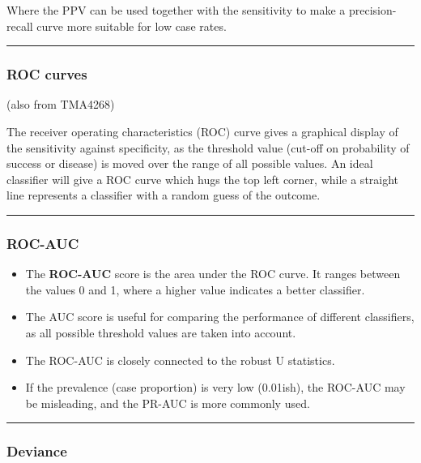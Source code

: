 \documentclass[
]{article}
\providecommand{\tightlist}{%
  \setlength{\itemsep}{0pt}\setlength{\parskip}{0pt}}
\begin{document}
Where the PPV can be used together with the sensitivity to make a
precision-recall curve more suitable for low case rates.

\begin{center}\rule{0.5\linewidth}{0.5pt}\end{center}

\hypertarget{roc-curves}{%
\subsubsection{ROC curves}\label{roc-curves}}

(also from TMA4268)

The receiver operating characteristics (ROC) curve gives a graphical
display of the sensitivity against specificity, as the threshold value
(cut-off on probability of success or disease) is moved over the range
of all possible values. An ideal classifier will give a ROC curve which
hugs the top left corner, while a straight line represents a classifier
with a random guess of the outcome.

\begin{center}\rule{0.5\linewidth}{0.5pt}\end{center}

\hypertarget{roc-auc}{%
\subsubsection{ROC-AUC}\label{roc-auc}}

\begin{itemize}
\tightlist
\item
  The \textbf{ROC-AUC} score is the area under the ROC curve. It ranges
  between the values 0 and 1, where a higher value indicates a better
  classifier. 
\item
  The AUC score is useful for comparing the performance of different
  classifiers, as all possible threshold values are taken into account.
\item
  The ROC-AUC is closely connected to the robust U statistics.
\item
  If the prevalence (case proportion) is very low (0.01ish), the ROC-AUC
  may be misleading, and the PR-AUC is more commonly used.
\end{itemize}

\begin{center}\rule{0.5\linewidth}{0.5pt}\end{center}

\hypertarget{deviance}{%
\subsubsection{Deviance}\label{deviance}}
\end{document}
